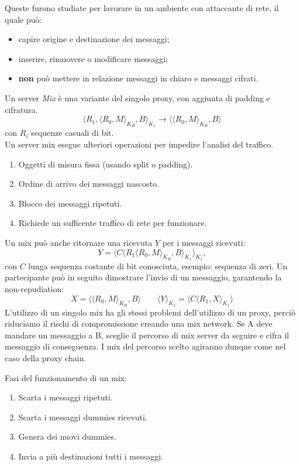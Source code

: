 \documentclass[a4paper, 11pt, notitlepage, fleqn]{report}
\begin{document}
Queste furono studiate per lavorare in un ambiente con attaccante di rete, il quale può:
\begin{itemize}
	\item capire origine e destinazione dei messaggi;
	\item inserire, rimuovere o modificare messaggi;
	\item \textbf{non} può mettere in relazione messaggi in chiaro e messaggi cifrati.
\end{itemize}
Un server \emph{Mix} è una variante del singolo proxy, con aggiunta di padding e cifratura.
\begin{equation*}
	\langle R_1, \langle R_0,M\rangle_{K_B},B\rangle_{K_1} \rightarrow \langle\langle R_0,M\rangle_{K_B},B\rangle
\end{equation*}
con $R_i$ sequenze casuali di bit.\\
Un server mix esegue ulteriori operazioni per impedire l'analisi del traffico.
\begin{enumerate}
	\item Oggetti di misura fissa (usando split o padding).
	\item Ordine di arrivo dei messaggi nascosto.
	\item Blocco dei messaggi ripetuti.
	\item Richiede un sufficente traffico di rete per funzionare.
\end{enumerate}
Un mix può anche ritornare una ricevuta $Y$ per i messaggi ricevuti:
\begin{equation*}
	Y = \langle C \langle R_1 \langle R_0, M\rangle_{K_B}, B \rangle_{K_1} \rangle_{K_1^{-1}}
\end{equation*}
con $C$ lunga sequenza costante di bit conosciuta, esempio: sequenza di zeri.
Un partecipante può in seguito dimostrare l'invio di un messaggio, garantendo la non-repudiation:
\begin{equation*}
	X = \langle\langle R_0, M\rangle_{K_B}, B \rangle \qquad \langle Y\rangle_{K_1} = \langle C \langle R_1, X \rangle_{K_1} \rangle
\end{equation*}
L'utilizzo di un singolo mix ha gli stessi problemi dell'utilizzo di un proxy, perciò riduciamo il rischi di compromissione creando una mix network. Se A deve mandare un messaggio a B, sceglie il percorso di mix server da seguire e cifra il messaggio di conseguenza. I mix del percorso scelto agiranno dunque come nel caso della proxy chain.

\noindent
Fasi del funzionamento di un mix:
\begin{enumerate}
	\item Scarta i messaggi ripetuti.
	\item Scarta i messaggi dummies ricevuti.
	\item Genera dei nuovi dummies.
	\item Invia a più destinazioni tutti i messaggi.
\end{enumerate}
\end{document}

